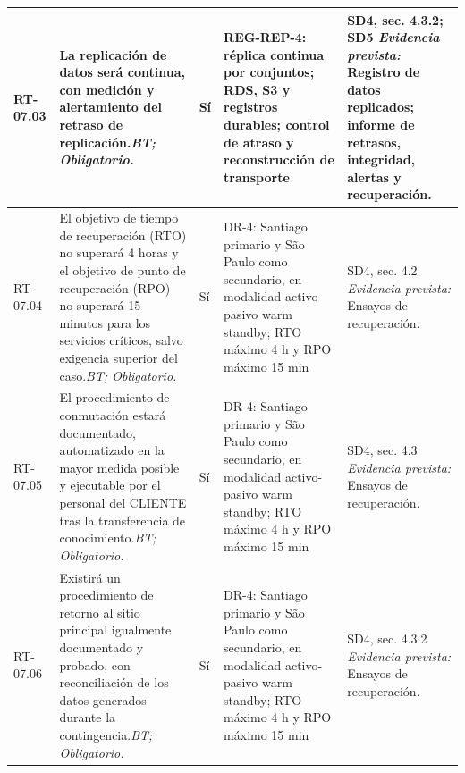\begin{paginaHorizontalSynaptix}
\begin{longtable}{|L{0.09\AnchoMatrizTDoce}|L{0.385\AnchoMatrizTDoce}|L{0.065\AnchoMatrizTDoce}|L{0.18\AnchoMatrizTDoce}|L{0.28\AnchoMatrizTDoce}|}
RT-\allowbreak{}07.\allowbreak{}03 &
La replicación de datos será continua, con medición y alertamiento del retraso de replicación.\newline\textit{BT; Obligatorio.} &
Sí &
REG-REP-4: réplica continua por conjuntos; RDS, S3 y registros durables; control de atraso y reconstrucción de transporte &
SD4, sec. 4.3.2; SD5 \newline\textit{Evidencia prevista:} Registro de datos replicados; informe de retrasos, integridad, alertas y recuperación. \\ \hline

RT-\allowbreak{}07.\allowbreak{}04 &
El objetivo de tiempo de recuperación (RTO) no superará 4 horas y el objetivo de punto de recuperación (RPO) no superará 15 minutos para los servicios críticos, salvo exigencia superior del caso.\newline\textit{BT; Obligatorio.} &
Sí &
DR-4: Santiago primario y São Paulo como secundario, en modalidad activo-pasivo warm standby; RTO máximo 4 h y RPO máximo 15 min &
SD4, sec. 4.2 \newline\textit{Evidencia prevista:} Ensayos de recuperación. \\ \hline

RT-\allowbreak{}07.\allowbreak{}05 &
El procedimiento de conmutación estará documentado, automatizado en la mayor medida posible y ejecutable por el personal del CLIENTE tras la transferencia de conocimiento.\newline\textit{BT; Obligatorio.} &
Sí &
DR-4: Santiago primario y São Paulo como secundario, en modalidad activo-pasivo warm standby; RTO máximo 4 h y RPO máximo 15 min &
SD4, sec. 4.3 \newline\textit{Evidencia prevista:} Ensayos de recuperación. \\ \hline

RT-\allowbreak{}07.\allowbreak{}06 &
Existirá un procedimiento de retorno al sitio principal igualmente documentado y probado, con reconciliación de los datos generados durante la contingencia.\newline\textit{BT; Obligatorio.} &
Sí &
DR-4: Santiago primario y São Paulo como secundario, en modalidad activo-pasivo warm standby; RTO máximo 4 h y RPO máximo 15 min &
SD4, sec. 4.3.2 \newline\textit{Evidencia prevista:} Ensayos de recuperación. \\ \hline


\end{longtable}
\end{paginaHorizontalSynaptix}
